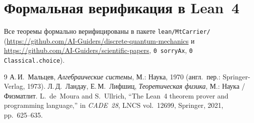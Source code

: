 \documentclass[11pt,a4paper]{article}
\theoremstyle{plain}
\theoremstyle{definition}
\begin{document}
\section{Формальная верификация в Lean~4}
Все теоремы формально верифицированы в пакете \texttt{lean/MtCarrier/} (\url{https://github.com/AI-Guiders/discrete-quantum-mechanics} и \url{https://github.com/AI-Guiders/scientific-papers}, \texttt{0 sorryAx}, \texttt{0 Classical.choice}).

\begin{thebibliography}{9}
А.\,И.~Мальцев, \emph{Алгебраические системы}, М.: Наука, 1970 (англ.\ пер.: Springer-Verlag, 1973).
Л.\,Д.~Ландау, Е.\,М.~Лифшиц, \emph{Теоретическая физика}, М.: Наука / Физматлит.
L.~de~Moura and S.~Ullrich, ``The Lean~4 theorem prover and programming language,'' in \emph{CADE~28}, LNCS vol.~12699, Springer, 2021, pp.~625--635.
\end{thebibliography}
\end{document}
